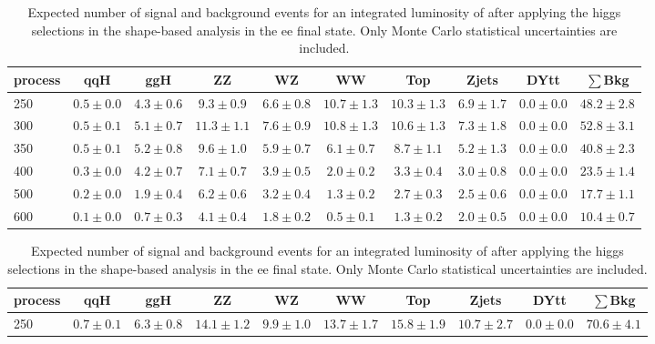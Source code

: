 \begin{table}
{\footnotesize
 \begin{center}
 \begin{tabular}{l | c c | c c c c c c c }
 \hline
 process & qqH & ggH & ZZ & WZ & WW & Top & Zjets & DYtt & $\sum$Bkg \\

 \hline
250 & $0.5\pm0.0$ & $4.3\pm0.6$ & $9.3\pm0.9$ & $6.6\pm0.8$ & $10.7\pm1.3$ & $10.3\pm1.3$ & $6.9\pm1.7$ & $0.0\pm0.0$ & $48.2\pm2.8$  \\ %
300 & $0.5\pm0.1$ & $5.1\pm0.7$ & $11.3\pm1.1$ & $7.6\pm0.9$ & $10.8\pm1.3$ & $10.6\pm1.3$ & $7.3\pm1.8$ & $0.0\pm0.0$ & $52.8\pm3.1$ \\%
350 & $0.5\pm0.1$ & $5.2\pm0.8$ & $9.6\pm1.0$ & $5.9\pm0.7$ & $6.1\pm0.7$ & $8.7\pm1.1$ & $5.2\pm1.3$ & $0.0\pm0.0$ & $40.8\pm2.3$ \\%
400 & $0.3\pm0.0$ & $4.2\pm0.7$ & $7.1\pm0.7$ & $3.9\pm0.5$ & $2.0\pm0.2$ & $3.3\pm0.4$ & $3.0\pm0.8$ & $0.0\pm0.0$ & $23.5\pm1.4$ \\%
500 & $0.2\pm0.0$ & $1.9\pm0.4$ & $6.2\pm0.6$ & $3.2\pm0.4$ & $1.3\pm0.2$ & $2.7\pm0.3$ & $2.5\pm0.6$ & $0.0\pm0.0$ & $17.7\pm1.1$ \\%
600 & $0.1\pm0.0$ & $0.7\pm0.3$ & $4.1\pm0.4$ & $1.8\pm0.2$ & $0.5\pm0.1$ & $1.3\pm0.2$ & $2.0\pm0.5$ & $0.0\pm0.0$ & $10.4\pm0.7$ \\%
\hline
\end{tabular}
\end{center}
\label{tab:yield_shapebased_ee}
}
\caption{Expected number of signal and background events for an 
  integrated luminosity of \intlumi after applying the higgs selections in the shape-based analysis in the ee final state. 
  Only Monte Carlo statistical uncertainties are included. }
{\footnotesize
 \begin{center}
 \begin{tabular}{l | c c |  c c c c c c c }
 \hline
 process & qqH & ggH & ZZ & WZ & WW & Top & Zjets & DYtt & $\sum$Bkg \\
 \hline
250 & $0.7\pm0.1$ & $6.3\pm0.8$ & $14.1\pm1.2$ & $9.9\pm1.0$ & $13.7\pm1.7$ & $15.8\pm1.9$ & $10.7\pm2.7$ & $0.0\pm0.0$ & $70.6\pm4.1$ \\ %

\end{tabular}
\end{center}}
\end{table}
